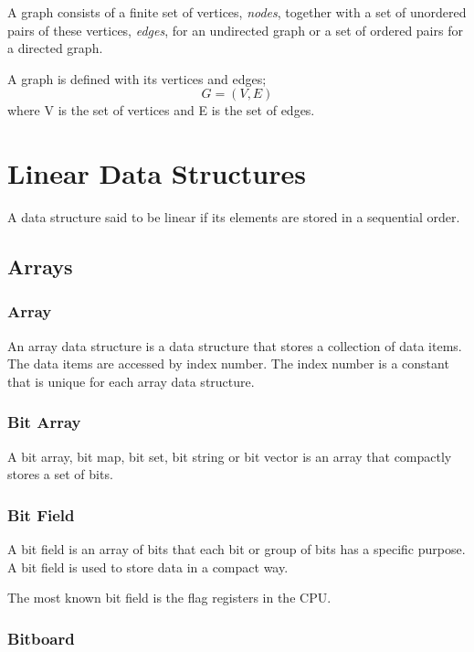 \documentclass{book}
\begin{document}
    \noindent A graph consists of a finite set of vertices, \textit{nodes}, together with a set of unordered pairs of these vertices, \textit{edges}, for an undirected graph or a set of ordered pairs for a directed graph.

    \noindent A graph is defined with its vertices and edges; 
    $$ G = (V, E) $$
    \noindent where V is the set of vertices and E is the set of edges.
    
\chapter{Linear Data Structures}

A data structure said to be linear if its elements are stored in a sequential order.

\section{Arrays}

\subsection{Array}

An array data structure is a data structure that stores a collection of data items. The data items are accessed by index number. The index number is a constant that is unique for each array data structure.

\subsection{Bit Array}

A bit array, bit map, bit set, bit string or bit vector is an array that compactly stores a set of bits.

\subsection{Bit Field}

A bit field is an array of bits that each bit or group of bits has a specific purpose. A bit field is used to store data in a compact way.

\noindent The most known bit field is the flag registers in the CPU.

\subsection{Bitboard}
\end{document}
